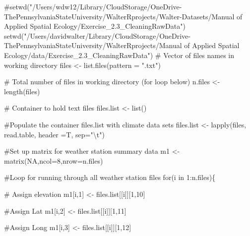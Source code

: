 \documentclass[
  letterpaper,
]{book}
\newenvironment{Shaded}{\begin{snugshade}}{\end{snugshade}}
\newcommand{\AttributeTok}[1]{\textcolor[rgb]{0.40,0.45,0.13}{#1}}
\newcommand{\CommentTok}[1]{\textcolor[rgb]{0.37,0.37,0.37}{#1}}
\newcommand{\ConstantTok}[1]{\textcolor[rgb]{0.56,0.35,0.01}{#1}}
\newcommand{\ControlFlowTok}[1]{\textcolor[rgb]{0.00,0.23,0.31}{#1}}
\newcommand{\DecValTok}[1]{\textcolor[rgb]{0.68,0.00,0.00}{#1}}
\newcommand{\FunctionTok}[1]{\textcolor[rgb]{0.28,0.35,0.67}{#1}}
\newcommand{\NormalTok}[1]{\textcolor[rgb]{0.00,0.23,0.31}{#1}}
\newcommand{\OtherTok}[1]{\textcolor[rgb]{0.00,0.23,0.31}{#1}}
\newcommand{\SpecialCharTok}[1]{\textcolor[rgb]{0.37,0.37,0.37}{#1}}
\newcommand{\StringTok}[1]{\textcolor[rgb]{0.13,0.47,0.30}{#1}}
\begin{document}
\begin{Shaded}
\begin{Highlighting}[]
\CommentTok{\#setwd("/Users/wdw12/Library/CloudStorage/OneDrive{-}ThePennsylvaniaStateUniversity/WalterRprojects/Walter{-}Datasets/Manual of Applied Spatial Ecology/Exercise\_2.3\_CleaningRawData")}
\FunctionTok{setwd}\NormalTok{(}\StringTok{"/Users/davidwalter/Library/CloudStorage/OneDrive{-}ThePennsylvaniaStateUniversity/WalterRprojects/Manual of Applied Spatial Ecology/data/Exercise\_2.3\_CleaningRawData"}\NormalTok{)}
\CommentTok{\# Vector of files names in working directory}
\NormalTok{files }\OtherTok{\textless{}{-}} \FunctionTok{list.files}\NormalTok{(}\AttributeTok{pattern =} \StringTok{".txt"}\NormalTok{)}

\CommentTok{\# Total number of files in working directory (for loop below)}
\NormalTok{n.files }\OtherTok{\textless{}{-}} \FunctionTok{length}\NormalTok{(files)}

\CommentTok{\# Container to hold text files}
\NormalTok{files.list }\OtherTok{\textless{}{-}} \FunctionTok{list}\NormalTok{()}

\CommentTok{\#Populate the container files.list with climate data sets}
\NormalTok{files.list }\OtherTok{\textless{}{-}} \FunctionTok{lapply}\NormalTok{(files, read.table, }\AttributeTok{header =}\NormalTok{T, }\AttributeTok{sep=}\StringTok{"}\SpecialCharTok{\textbackslash{}t}\StringTok{"}\NormalTok{) }

\CommentTok{\#Set up matrix for weather station summary data}
\NormalTok{m1 }\OtherTok{\textless{}{-}} \FunctionTok{matrix}\NormalTok{(}\ConstantTok{NA}\NormalTok{,}\AttributeTok{ncol=}\DecValTok{8}\NormalTok{,}\AttributeTok{nrow=}\NormalTok{n.files)}

\CommentTok{\#Loop for running through all weather station files}
\ControlFlowTok{for}\NormalTok{(i }\ControlFlowTok{in} \DecValTok{1}\SpecialCharTok{:}\NormalTok{n.files)\{}
      
    \CommentTok{\# Assign elevation}
\NormalTok{        m1[i,}\DecValTok{1}\NormalTok{] }\OtherTok{\textless{}{-}}\NormalTok{ files.list[[i]][}\DecValTok{1}\NormalTok{,}\DecValTok{10}\NormalTok{]}

    \CommentTok{\#Assign Lat}
\NormalTok{        m1[i,}\DecValTok{2}\NormalTok{] }\OtherTok{\textless{}{-}}\NormalTok{ files.list[[i]][}\DecValTok{1}\NormalTok{,}\DecValTok{11}\NormalTok{]}

    \CommentTok{\#Assign Long}
\NormalTok{        m1[i,}\DecValTok{3}\NormalTok{] }\OtherTok{\textless{}{-}}\NormalTok{ files.list[[i]][}\DecValTok{1}\NormalTok{,}\DecValTok{12}\NormalTok{]}


\end{Highlighting}
\end{Shaded}
\end{document}
